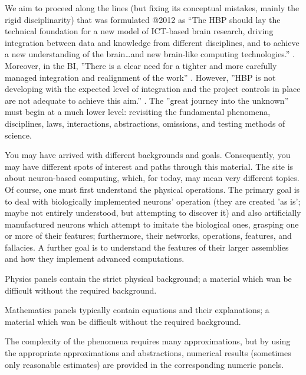 We aim to proceed along the lines (but fixing its conceptual mistakes, mainly the rigid disciplinarity) that was formulated @2012 as “The \gls{HBP} should lay the technical foundation for a new model of \gls{ICT}-based brain research, driving integration between data and knowledge from different disciplines, and to achieve a new understanding of the brain…and new brain-like computing technologies.” \cite{HBP_ScientificAdvances:2023}. Moreover, in the \gls{BI}, ”There is a clear need for a tighter and more carefully managed integration and realignment of the work” \cite{BrainInitiative10:2024}. However, ”\gls{HBP} is not developing with the expected level of integration and the project controls in place are not adequate to achieve this aim.” \cite{HBP_ScientificAdvances:2023}. The ”great journey into the unknown” \cite{BrainInitiative10:2024} must begin at a much lower level: revisiting the fundamental phenomena, disciplines, laws, interactions, abstractions, omissions, and testing methods of science.


You may have arrived with different backgrounds and goals. Consequently, you may have different spots of interest and paths through this material.
The site is about neuron-based computing, which, for today, may mean
very different topics. Of course, one must first understand the
physical operations.  The primary goal is to deal with biologically
implemented neurons' operation (they are created 'as is'; maybe not entirely understood,
but attempting to discover it) and also artificially manufactured neurons
which attempt to imitate the biological ones, grasping one or more
of their features; furthermore, their networks, operations, features,
and fallacies. A further goal is to understand the features of their
larger assemblies and how they implement advanced computations.

{
Physics panels contain the strict physical background; a material
which wan be difficult without the required background.
}

{Mathematics panels typically contain equations and 
their explanations; a material
which wan be difficult without the required background.
}

{
The complexity of the phenomena requires many approximations, but by using the appropriate approximations and abstractions,  numerical results (sometimes only reasonable estimates) are provided in the corresponding numeric panels.
}

